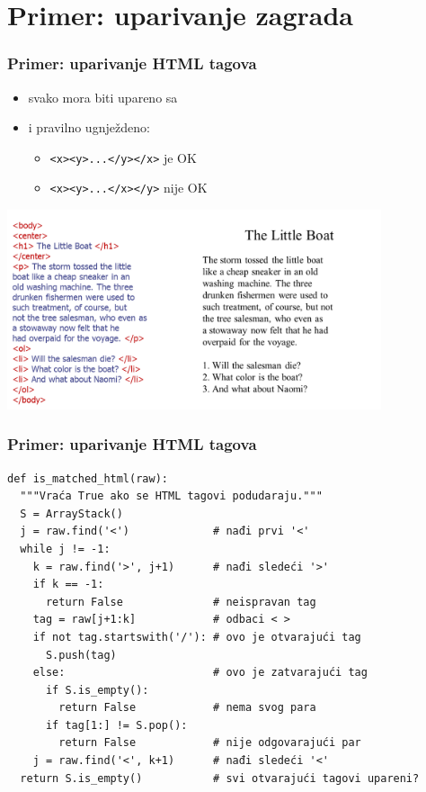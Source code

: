 \documentclass[compress,aspectratio=169]{beamer}
\begin{document}
\section[P: HTML]{Primer: uparivanje zagrada}
\begin{frame}[fragile,shrink=10]
  \frametitle{Primer: uparivanje HTML tagova}
  \begin{itemize}
    \item svako  mora biti upareno sa 
    \item i pravilno ugnježdeno:
    \begin{itemize}
      \item \texttt{<x><y>...</y></x>} je OK
      \item \texttt{<x><y>...</x></y>} nije OK
    \end{itemize}
  \end{itemize}
  \begin{center}
    \includegraphics[width=11cm]{asp-05-pic04.png}
  \end{center}
\end{frame}

\begin{frame}[fragile,shrink=10]
  \frametitle{Primer: uparivanje HTML tagova}
\begin{verbatim}
def is_matched_html(raw):
  """Vraća True ako se HTML tagovi podudaraju."""
  S = ArrayStack()
  j = raw.find('<')             # nađi prvi '<'
  while j != -1:
    k = raw.find('>', j+1)      # nađi sledeći '>'
    if k == -1:
      return False              # neispravan tag
    tag = raw[j+1:k]            # odbaci < >
    if not tag.startswith('/'): # ovo je otvarajući tag
      S.push(tag)
    else:                       # ovo je zatvarajući tag
      if S.is_empty():
        return False            # nema svog para
      if tag[1:] != S.pop():
        return False            # nije odgovarajući par
    j = raw.find('<', k+1)      # nađi sledeći '<'
  return S.is_empty()           # svi otvarajući tagovi upareni?
\end{verbatim}
\end{frame}
\end{document}
